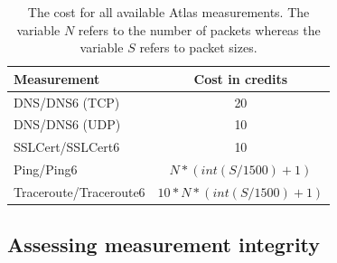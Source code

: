 %
%
%

% 

\begin{table}[t]
\centering
\begin{tabular}{lc}
\textbf{Measurement} & \textbf{Cost in credits} \\
\hline 
DNS\slash DNS6 (TCP) & 20\\ 
DNS\slash DNS6 (UDP) & 10\\ 
SSLCert\slash SSLCert6 & 10 \\
Ping\slash Ping6 & $N * (int(S/1500)+1)$\\
Traceroute\slash Traceroute6 & $ 10*N*(int(S/1500)+1)$\\
\hline 
\end{tabular} 
\caption{The cost for all available Atlas measurements.  The variable $N$
refers to the number of packets whereas the variable $S$ refers to packet
sizes.}
\label{tab:cost} 
\end{table}

\subsection{Assessing measurement integrity}

